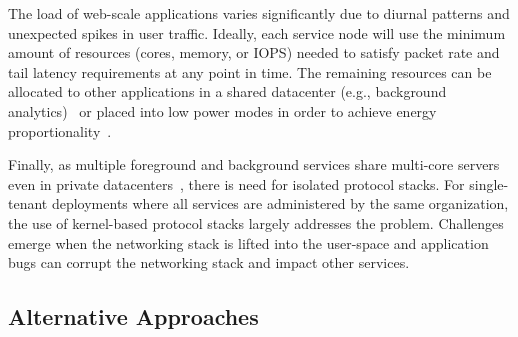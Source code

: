  The load of web-scale applications varies
significantly due to diurnal patterns and unexpected spikes in user
traffic. Ideally, each service node will use the minimum amount of
resources (cores, memory, or IOPS) needed to satisfy packet rate and
tail latency requirements at any point in time. The remaining
resources can be allocated to other applications in a shared
datacenter (e.g., background
analytics)~\cite{Hindman:2011:MPF,DBLP:conf/asplos/DelimitrouK14,Leverich:RHSU:2014}
or placed into low power modes in order to achieve energy
proportionality~\cite{DBLP:journals/computer/BarrosoH07}.


 Finally, as multiple foreground and
background services share multi-core servers even in private
datacenters~\cite{Schwarzkopf:2013:OFS,DBLP:journals/cacm/DeanB13},
there is need for isolated protocol stacks. For single-tenant
deployments where all services are administered by the same
organization, the use of kernel-based protocol stacks largely
addresses the problem.  Challenges emerge when the networking stack is
lifted into the user-space and application bugs can corrupt the
networking stack and impact other services.


\subsection{Alternative Approaches}
\label{sec:motivation:current}

